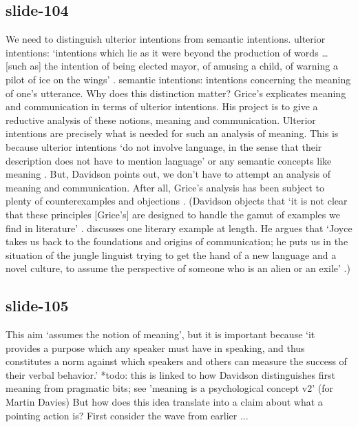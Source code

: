 \documentclass[12pt,\papersize]{extarticle}
\begin{document}
\subsection{slide-104}
We need to distinguish ulterior intentions from semantic intentions.
ulterior intentions: ‘intentions which lie as it were beyond the production of words … [such as] the intention of being elected mayor, of amusing a child, of warning a pilot of ice on the wings’ \citep[p.\ 298]{Davidson:1992pl}.
semantic intentions: intentions concerning the meaning of one’s utterance.
Why does this distinction matter?
Grice’s explicates meaning and communication in terms of ulterior intentions.
His project is to give a reductive analysis of these notions, meaning and communication.
Ulterior intentions are precisely what is needed for such an analysis of meaning.
This is because ulterior intentions ‘do not involve language, in the sense that their description does not have to mention language’ or any semantic concepts like meaning \citep[p.\ 298]{Davidson:1992pl}.
But, Davidson points out, we don’t have to attempt an analysis of meaning and communication.
After all, Grice’s analysis has been subject to plenty of counterexamples and objections \citep{Schiffer:1987zb}.
(Davidson objects that ‘it is not clear that these principles [Grice’s] are designed to handle the gamut of examples we find in literature’ \citep[p.\ 300]{Davidson:1992pl}.
\citet{Davidson:1991ic} discusses one literary example at length. He argues that ‘Joyce takes us back to the foundations and origins of communication; he puts us in the situation of the jungle linguist trying to get the hand of a new language and a novel culture, to assume the perspective of someone who is an alien or an exile’ \citep[p.\ 11]{Davidson:1991ic}.)
 
 
\subsection{slide-105}
This aim ‘assumes the notion of meaning’, but it is important because ‘it provides a purpose which any speaker must have in speaking, and thus constitutes a norm against which speakers and others can measure the success of their verbal behavior.’ \citep[p.\ 11]{Davidson:1994ol}
*todo: this is linked to how Davidson distinguishes first meaning from pragmatic bits; see 'meaning is a psychological concept v2' (for Martin Davies)
But how does this idea translate into a claim about what a pointing action is?
First consider the wave from earlier ...
 
\end{document}
